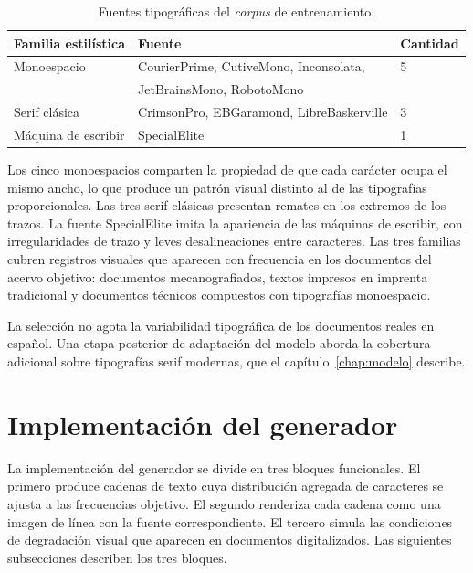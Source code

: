 \begin{table}[!htbp]
	\centering
	\caption{Fuentes tipográficas del \textit{corpus} de entrenamiento.}
	\label{tab:fuentes-entrenamiento}
	\begin{tabular}{lll}
		\toprule
		\textbf{Familia estilística} & \textbf{Fuente} & \textbf{Cantidad} \\
		\midrule
		Monoespacio & CourierPrime, CutiveMono, Inconsolata, & 5 \\
		& JetBrainsMono, RobotoMono & \\
		\addlinespace
		Serif clásica & CrimsonPro, EBGaramond, LibreBaskerville & 3 \\
		\addlinespace
		Máquina de escribir & SpecialElite & 1 \\
		\bottomrule
	\end{tabular}
\end{table}

Los cinco monoespacios comparten la propiedad de que cada carácter ocupa el mismo ancho, lo que produce un patrón visual distinto al de las tipografías proporcionales. Las tres serif clásicas presentan remates en los extremos de los trazos. La fuente SpecialElite imita la apariencia de las máquinas de escribir, con irregularidades de trazo y leves desalineaciones entre caracteres. Las tres familias cubren registros visuales que aparecen con frecuencia en los documentos del acervo objetivo: documentos mecanografiados, textos impresos en imprenta tradicional y documentos técnicos compuestos con tipografías monoespacio.

La selección no agota la variabilidad tipográfica de los documentos reales en español. Una etapa posterior de adaptación del modelo aborda la cobertura adicional sobre tipografías serif modernas, que el capítulo~\ref{chap:modelo} describe.

\section{Implementación del generador}
\label{sec:implementacion-generador}

La implementación del generador se divide en tres bloques funcionales. El primero produce cadenas de texto cuya distribución agregada de caracteres se ajusta a las frecuencias objetivo. El segundo renderiza cada cadena como una imagen de línea con la fuente correspondiente. El tercero simula las condiciones de degradación visual que aparecen en documentos digitalizados. Las siguientes subsecciones describen los tres bloques.

